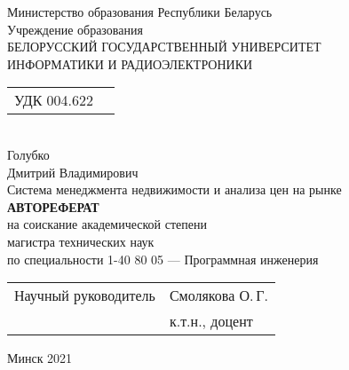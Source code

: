 \begin{titlepage}
  \begin{center}
    Министерство образования Республики Беларусь\\[1em]
    Учреждение образования\\
    БЕЛОРУССКИЙ ГОСУДАРСТВЕННЫЙ УНИВЕРСИТЕТ \\
    ИНФОРМАТИКИ И РАДИОЭЛЕКТРОНИКИ\\[3em]

    \begin{tabular}{ p{}p{} }
      УДК 004.622 & \\
    \end{tabular}\\[5em]


    {Голубко}\\
    {Дмитрий Владимирович}\\[1em]

    {Система менеджмента недвижимости и анализа цен на рынке}\\[5em]

    \textbf{АВТОРЕФЕРАТ}\\
    {на соискание академической степени}\\
    {магистра технических наук}\\[1em]

    {по специальности 1-40 80 05 — Программная инженерия}\\[8em]

    \begin{tabular}{ p{}p{} }
      Научный руководитель & Смолякова О.\,Г. \\
       & к.т.н., доцент\\
    \end{tabular}
    
    \vfill
    {\normalsize Минск 2021}
  \end{center}
\end{titlepage}

